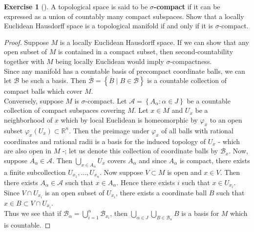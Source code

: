 \documentclass[reqno]{amsart}
\theoremstyle{plain}%
\theoremstyle{definition}
\newtheorem{exercise}[theorem]{Exercise}
\theoremstyle{remark}
\begin{document}
    \begin{exercise}[]
        A topological space is said to be \textbf{$\sigma$-compact} if
        it can be expressed as a union of countably many compact
        subspaces. Show that a locally Euclidean Hausdorff space
        is a topological manifold if and only if it is
        $\sigma $-compact.
    \end{exercise}

    \begin{proof}
        Suppose $M$ is a locally Euclidean Hausdorff space. If
         we can show that any open subset of $M$ is contained in
         a compact subset, then second-countability together
         with $M$ being locally Euclidean would imply
         $\sigma $-compactness.\\
         Since any manifold has a countable basis of precompact
         coordinate balls, we can let $\mathcal{B}$ be such a basis.
         Then $\overline{\mathcal{B}}=
         \left\{ \overline{B}  \mid B \in \mathcal{B} \right\} $ is
         a countable collection of compact balls which cover
         $M$.\\
         Conversely, suppose $M$ is $\sigma $-compact. Let
         $\mathcal{A} = \left\{ A_{\alpha}  \colon
         \alpha \in J \right\} $ be a countable collection of compact
         subspaces covering $M$. 
         Let $x \in M$ and $U_x$ be a neighborhood of $x$ which
         by local Euclidean is homeomorphic by $\varphi_x$ to an
         open subset $\varphi_x \left( U_x \right) \subset
         \mathbb{R}^{n}$.
         Then the preimage under $\varphi_x$ of all balls
         with rational coordinates and rational radii is a basis for
         the induced topology of $U_x$ - which are also open in $M$ -;
         let us denote this collection of coordinate balls by
         $\mathcal{B}_x$.
         Now, suppose $A_{\alpha} \in \mathcal{A}$. Then
         $\bigcup_{x \in A_{\alpha}} U_x$ covers
         $A_{\alpha}$ and since $A_{\alpha}$ is compact, there exists
         a finite subcollection $U_{x_1}, \ldots, U_{x_n}$.
         Now suppose $V \subset M$ is open and $x \in V$. Then there
         exists $A_{\alpha} \in \mathcal{A}$ such that
         $x \in A_{\alpha}$. Hence there exists
          $i$ such that $x \in U_{x_i}$. Since $V \cap U_{x_i}$ is
          an open subset of $U_{x_i}$, there exists a coordinate ball
          $B$ such that $x \in B \subset V \cap U_{x_i}$.\\
          Thus we see that if
          $\mathcal{B}_{\alpha} =
          \bigcup_{i=1}^{n} \mathcal{B}_{x_i}$, then
          $\bigcup_{\alpha \in J} \bigcup_{B
          \in \mathcal{B}_{\alpha}} B$ is a basis for
          $M$ which is countable.
    \end{proof}
\end{document}
